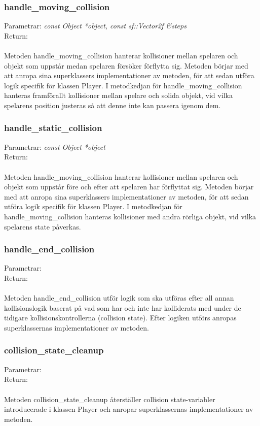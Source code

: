 \documentclass{TDP003mall}
\begin{document}
 \subsubsection{handle\_moving\_collision}
Parametrar: \textit{const Object *object, const sf::Vector2f \&steps}
\\Return: \textit{}
\\\\
Metoden handle\_moving\_collision hanterar kollisioner mellan spelaren och objekt som uppstår medan spelaren försöker förflytta sig. Metoden börjar med att anropa sina superklassers implementationer av metoden, för att sedan utföra logik specifik för klassen Player. I metodkedjan för handle\_moving\_collision hanteras framförallt kollisioner mellan spelare och solida objekt, vid vilka spelarens position justeras så att denne inte kan passera igenom dem.

 \subsubsection{handle\_static\_collision}
Parametrar: \textit{const Object *object}
\\Return: \textit{}
\\\\
Metoden handle\_moving\_collision hanterar kollisioner mellan spelaren och objekt som uppstår före och efter att spelaren har förflyttat sig. Metoden börjar med att anropa sina superklassers implementationer av metoden, för att sedan utföra logik specifik för klassen Player. I metodkedjan för handle\_moving\_collision hanteras kollisioner med andra rörliga objekt, vid vilka spelarens state påverkas.

 \subsubsection{handle\_end\_collision}
Parametrar: \textit{}
\\Return: \textit{}
\\\\
Metoden handle\_end\_collision utför logik som ska utföras efter all annan kollisionslogik baserat på vad som har och inte har kolliderats med under de tidigare kollisionskontrollerna (collision state). Efter logiken utförs anropas superklassernas implementationer av metoden.

 \subsubsection{collision\_state\_cleanup}
Parametrar: \textit{}
\\Return: \textit{}
\\\\
Metoden collision\_state\_cleanup återställer collision state-variabler introducerade i klassen Player och anropar superklassernas implementationer av metoden.
\end{document}
